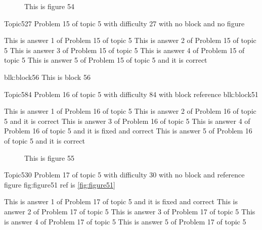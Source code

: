 \documentclass[master]{exam}
\begin{document}
\begin{figure}
	\begin{center}
		This is figure 54 
		\label{fig:figure54}
	\end{center}
\end{figure}

\begin{problem}{Topic5}{27}
	Problem 15 of topic 5 with difficulty 27 with no block and no figure
	\begin{answers}
		\answer This is answer 1 of Problem 15 of topic 5 
		\answer This is answer 2 of Problem 15 of topic 5 
		\answer This is answer 3 of Problem 15 of topic 5 
		\answer This is answer 4 of Problem 15 of topic 5 
		\answer[correct] This is answer 5 of Problem 15 of topic 5 and it is correct
	\end{answers}
\end{problem}



\begin{block}{blk:block56}
This is block 56
\end{block}


\begin{problem}[requires=blk:block51]{Topic5}{84}
	Problem 16 of topic 5 with difficulty 84 with block reference blk:block51
	\begin{answers}
		\answer This is answer 1 of Problem 16 of topic 5 
		\answer[correct] This is answer 2 of Problem 16 of topic 5 and it is correct
		\answer This is answer 3 of Problem 16 of topic 5 
		 This is answer 4 of Problem 16 of topic 5 and it is fixed and correct
		\answer[correct] This is answer 5 of Problem 16 of topic 5 and it is correct
	\end{answers}
\end{problem}



\begin{figure}
	\begin{center}
		This is figure 55 
		\label{fig:figure55}
	\end{center}
\end{figure}

\begin{problem}{Topic5}{30}
	Problem 17 of topic 5 with difficulty 30 with no block and reference figure fig:figure51 ref is \ref{fig:figure51}
	\begin{answers}
		 This is answer 1 of Problem 17 of topic 5 and it is fixed and correct
		\answer This is answer 2 of Problem 17 of topic 5 
		\answer This is answer 3 of Problem 17 of topic 5 
		\answer This is answer 4 of Problem 17 of topic 5 
		\answer This is answer 5 of Problem 17 of topic 5 
	\end{answers}
\end{problem}
\end{document}
